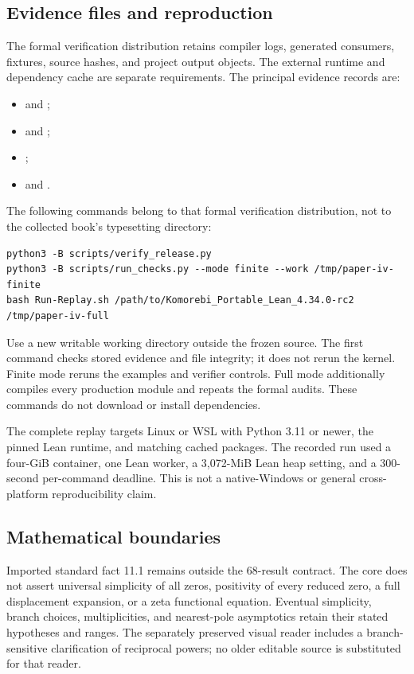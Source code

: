 \subsection{Evidence files and reproduction}
The formal verification distribution retains compiler logs, generated consumers, fixtures, source hashes, and project output objects. The external runtime and dependency cache are separate requirements. The principal evidence records are:
\begin{itemize}
\item {} and ;
\item {} and ;
\item {};
\item {} and .
\end{itemize}
The following commands belong to that formal verification distribution, not to the collected book's typesetting directory:
\begin{Verbatim}[fontsize=\small,breaklines=true,breakanywhere=true]
python3 -B scripts/verify_release.py
python3 -B scripts/run_checks.py --mode finite --work /tmp/paper-iv-finite
bash Run-Replay.sh /path/to/Komorebi_Portable_Lean_4.34.0-rc2 /tmp/paper-iv-full
\end{Verbatim}
Use a new writable working directory outside the frozen source. The first command checks stored evidence and file integrity; it does not rerun the kernel. Finite mode reruns the examples and verifier controls. Full mode additionally compiles every production module and repeats the formal audits. These commands do not download or install dependencies.

The complete replay targets Linux or WSL with Python 3.11 or newer, the pinned Lean runtime, and matching cached packages. The recorded run used a four-GiB container, one Lean worker, a 3,072-MiB Lean heap setting, and a 300-second per-command deadline. This is not a native-Windows or general cross-platform reproducibility claim.

\subsection{Mathematical boundaries}
Imported standard fact 11.1 remains outside the 68-result contract. The core does not assert universal simplicity of all zeros, positivity of every reduced zero, a full displacement expansion, or a zeta functional equation. Eventual simplicity, branch choices, multiplicities, and nearest-pole asymptotics retain their stated hypotheses and ranges. The separately preserved visual reader includes a branch-sensitive clarification of reciprocal powers; no older editable source is substituted for that reader.
